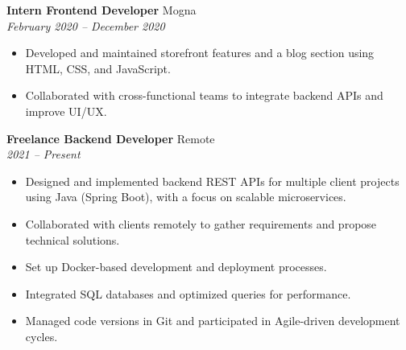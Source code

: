 
\textbf{Intern Frontend Developer} \hfill Mogna \\
\textit{February 2020 -- December 2020}
\vspace{-6pt}
\begin{itemize}[leftmargin=*,noitemsep]
    \item Developed and maintained storefront features and a blog section using HTML, CSS, and JavaScript.
    \item Collaborated with cross-functional teams to integrate backend APIs and improve UI/UX.
\end{itemize}

\textbf{Freelance Backend Developer} \hfill Remote \\
\textit{2021 -- Present}
\vspace{-6pt}
\begin{itemize}[leftmargin=*,noitemsep]
    \item Designed and implemented backend REST APIs for multiple client projects using Java (Spring Boot), with a focus on scalable microservices.
    \item Collaborated with clients remotely to gather requirements and propose technical solutions.
    \item Set up Docker-based development and deployment processes.
    \item Integrated SQL databases and optimized queries for performance.
    \item Managed code versions in Git and participated in Agile-driven development cycles.
\end{itemize}

